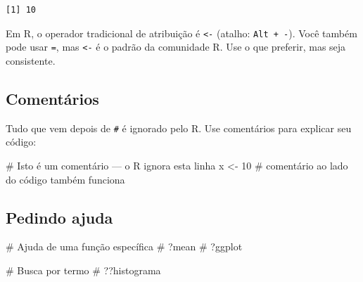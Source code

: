 \documentclass[
  letterpaper,
]{scrbook}
\newenvironment{Shaded}{\begin{snugshade}}{\end{snugshade}}
\newcommand{\CommentTok}[1]{\textcolor[rgb]{0.37,0.37,0.37}{#1}}
\newcommand{\DecValTok}[1]{\textcolor[rgb]{0.68,0.00,0.00}{#1}}
\newcommand{\NormalTok}[1]{\textcolor[rgb]{0.00,0.23,0.31}{#1}}
\newcommand{\OtherTok}[1]{\textcolor[rgb]{0.00,0.23,0.31}{#1}}
\begin{document}
\begin{verbatim}
[1] 10
\end{verbatim}

\begin{tcolorbox}[enhanced jigsaw, arc=.35mm, bottomrule=.15mm, bottomtitle=1mm, breakable, colback=white, colbacktitle=quarto-callout-important-color!10!white, colframe=quarto-callout-important-color-frame, coltitle=black, left=2mm, leftrule=.75mm, opacityback=0, opacitybacktitle=0.6, rightrule=.15mm, title=\textcolor{quarto-callout-important-color}{\faExclamation}\hspace{0.5em}{\texttt{\textless{}-} ou \texttt{=}?}, titlerule=0mm, toprule=.15mm, toptitle=1mm]

Em R, o operador tradicional de atribuição é \texttt{\textless{}-}
(atalho: \texttt{Alt\ +\ -}). Você também pode usar \texttt{=}, mas
\texttt{\textless{}-} é o padrão da comunidade R. Use o que preferir,
mas seja consistente.

\end{tcolorbox}

\subsection{Comentários}\label{comentuxe1rios}

Tudo que vem depois de \texttt{\#} é ignorado pelo R. Use comentários
para explicar seu código:

\begin{Shaded}
\begin{Highlighting}[]
\CommentTok{\# Isto é um comentário — o R ignora esta linha}
\NormalTok{x }\OtherTok{\textless{}{-}} \DecValTok{10}  \CommentTok{\# comentário ao lado do código também funciona}
\end{Highlighting}
\end{Shaded}

\subsection{Pedindo ajuda}\label{pedindo-ajuda}

\begin{Shaded}
\begin{Highlighting}[]
\CommentTok{\# Ajuda de uma função específica}
\CommentTok{\# ?mean}
\CommentTok{\# ?ggplot}

\CommentTok{\# Busca por termo}
\CommentTok{\# ??histograma}
\end{Highlighting}
\end{Shaded}
\end{document}
